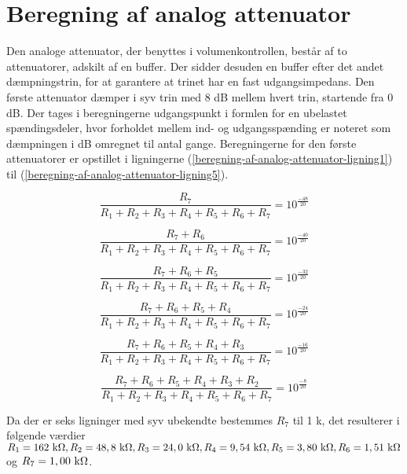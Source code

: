 \chapter{Beregning af analog attenuator}
\label{beregning-af-analog-attenuator}

Den analoge attenuator, der benyttes i volumenkontrollen, består af to attenuatorer, adskilt af en buffer. Der sidder desuden en buffer efter det andet dæmpningstrin, for at garantere at trinet har en fast udgangsimpedans. Den første attenuator dæmper i syv trin med 8 dB mellem hvert trin, startende fra 0 dB. Der tages i beregningerne udgangspunkt i formlen for en ubelastet spændingsdeler, hvor forholdet mellem ind- og udgangsspænding er noteret som dæmpningen i dB omregnet til antal gange. Beregningerne for den første attenuatorer er opstillet i ligningerne (\ref{beregning-af-analog-attenuator-ligning1}) til (\ref{beregning-af-analog-attenuator-ligning5}).

\begin{equation}
\label{beregning-af-analog-attenuator-ligning1}
\frac{R_7}{R_1 + R_2 + R_3 + R_4 + R_5 + R_6 + R_7} = 10^{\frac{-48}{20}}
\end{equation}

\begin{equation}
\frac{R_7 + R_6}{R_1 + R_2 + R_3 + R_4 + R_5 + R_6 + R_7} = 10^{\frac{-40}{20}}
\end{equation}

\begin{equation}
\frac{R_7 + R_6 + R_5}{R_1 + R_2 + R_3 + R_4 + R_5 + R_6 + R_7} = 10^{\frac{-32}{20}}
\end{equation}

\begin{equation}
\frac{R_7 + R_6 + R_5 + R_4}{R_1 + R_2 + R_3 + R_4 + R_5 + R_6 + R_7} = 10^{\frac{-24}{20}}
\end{equation}

\begin{equation}
\frac{R_7 + R_6 + R_5 + R_4 + R_3}{R_1 + R_2 + R_3 + R_4 + R_5 + R_6 + R_7} = 10^{\frac{-16}{20}}
\end{equation}

\begin{equation}
\label{beregning-af-analog-attenuator-ligning5}
\frac{R_7 + R_6 + R_5 + R_4 + R_3 + R_2}{R_1 + R_2 + R_3 + R_4 + R_5 + R_6 + R_7} = 10^{\frac{-8}{20}}
\end{equation}

Da der er seks ligninger med syv ubekendte bestemmes $R_7$ til 1 k\ohm, det resulterer i følgende værdier 
$R_1 = 162 ~\mathrm{k}\ohm, R_2 = 48,8 ~\mathrm{k}\ohm, R_3 = 24,0 ~\mathrm{k}\ohm, R_4 = 9,54 ~\mathrm{k}\ohm, R_5 = 3,80  ~\mathrm{k}\ohm, R_6 = 1,51 ~\mathrm{k}\ohm$ og $R_7 = 1,00 ~\mathrm{k}\ohm$.

